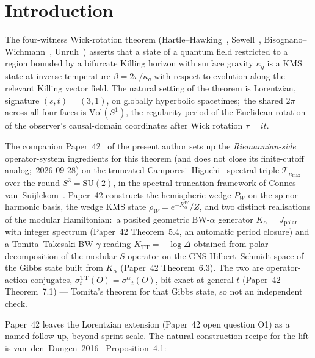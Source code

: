 \documentclass[11pt,a4paper]{article}
\theoremstyle{plain}
\theoremstyle{definition}
\newcommand{\nmax}{n_{\max}}
\newcommand{\sthree}{S^{3}}
\newcommand{\Tcal}{\mathcal{T}}
\newcommand{\SU}{\mathrm{SU}}
\newcommand{\Vol}{\mathrm{Vol}}
\newcommand{\TT}{\mathrm{TT}}
\begin{document}
\section{Introduction}\label{sec:intro}

The four-witness Wick-rotation theorem
(Hartle--Hawking~\cite{hartle_hawking1976}, Sewell~\cite{sewell1982},
Bisognano--Wichmann~\cite{bisognano_wichmann1976},
Unruh~\cite{unruh1976}) asserts that a state of a quantum field
restricted to a region bounded by a bifurcate Killing horizon with
surface gravity $\kappa_g$ is a KMS state at inverse temperature
$\beta = 2\pi / \kappa_g$ with respect to evolution along the
relevant Killing vector field. The natural setting of the theorem is
Lorentzian, signature $(s, t) = (3, 1)$, on globally hyperbolic
spacetimes;\ the shared $2\pi$ across all four faces is $\Vol(S^1)$,
the regularity period of the Euclidean rotation of the observer's
causal-domain coordinates after Wick rotation $\tau = i t$.

The companion Paper~42~\cite{paper42} of the present author sets up
the \emph{Riemannian-side} operator-system ingredients for this theorem
(and does not close its finite-cutoff analog;\ 2026-09-28) on the
truncated Camporesi--Higuchi~\cite{camporesi_higuchi1996} spectral
triple $\Tcal_{\nmax}$ over the round $\sthree = \SU(2)$, in the
spectral-truncation framework of
Connes--van~Suijlekom~\cite{connes_vs2021}. Paper~42 constructs the
hemispheric wedge $P_W$ on the spinor harmonic basis, the wedge KMS
state $\rho_W = e^{-K_\alpha^W}/Z$, and two distinct realisations of
the modular Hamiltonian:\ a posited geometric BW-$\alpha$ generator
$K_\alpha = J_{\mathrm{polar}}$ with integer spectrum
(Paper~42 Theorem~5.4, an automatic period closure) and a
Tomita--Takesaki BW-$\gamma$ reading $K_\TT = -\log \Delta$ obtained
from polar decomposition of the modular $S$ operator on the
GNS Hilbert--Schmidt space of the Gibbs state built from $K_\alpha$
(Paper~42 Theorem~6.3).
The two are operator-action conjugates,
$\sigma_t^\TT(O) = \sigma_{-t}^\alpha(O)$, bit-exact at general $t$
(Paper~42 Theorem~7.1) --- Tomita's theorem for that Gibbs state, so
not an independent check.

Paper~42 leaves the Lorentzian extension (Paper~42 open question O1)
as a named follow-up, beyond sprint scale. The natural construction recipe
for the lift is van~den~Dungen~2016~\cite{vandungen2016} Proposition~4.1:
\end{document}

